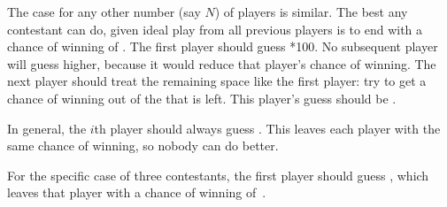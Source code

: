 \documentclass{article}
\begin{document}
The case for any other number (say $N$) of players is similar.
The best any contestant can do, given ideal play from all previous players is to end with a chance of winning of .
The first player should guess *100.
No subsequent player will guess higher, because it would reduce that player's chance of winning.
The next player should treat the remaining space like the first player: try to get a  chance of winning out of the  that is left.
This player's guess should be .

In general, the $i$th player should always guess .
This leaves each player with the same  chance of winning, so nobody can do better.

For the specific case of three contestants, the first player should guess , which leaves that player with a chance of winning of
\,.
\end{document}
